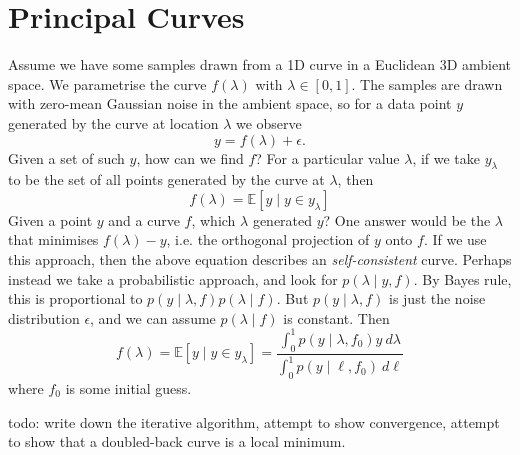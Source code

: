 \documentclass[a4paper]{article}
\begin{document}



    \section{Principal Curves}

        Assume we have some samples drawn from a 1D curve in a Euclidean 3D ambient space. We parametrise the curve $f(\lambda)$ with $\lambda \in [0, 1]$. The samples are drawn with zero-mean Gaussian noise in the ambient space, so for a data point $y$ generated by the curve at location $\lambda$ we observe
        \begin{equation}
            y = f(\lambda) + \epsilon.
        \end{equation}
        Given a set of such $y$, how can we find $f$? For a particular value $\lambda$, if we take $y_\lambda$ to be the set of all points generated by the curve at $\lambda$, then
        \begin{equation}
            f(\lambda) = \mathbb E[y \mid y \in y_\lambda]
        \end{equation}
        Given a point $y$ and a curve $f$, which $\lambda$ generated $y$? One answer would be the $\lambda$ that minimises $f(\lambda) - y$, i.e. the orthogonal projection of $y$ onto $f$. If we use this approach, then the above equation describes an \emph{self-consistent} curve. Perhaps instead we take a probabilistic approach, and look for $p(\lambda \mid y, f)$. By Bayes rule, this is proportional to $p(y \mid \lambda, f) p(\lambda \mid f)$. But $p(y \mid \lambda, f)$ is just the noise distribution $\epsilon$, and we can assume $p(\lambda \mid f)$ is constant. Then
        \begin{equation}
            f(\lambda) = \mathbb E[y \mid y \in y_\lambda] = \frac{\int_0^1 p(y \mid \lambda, f_0) y\  d\lambda}{\int_0^1 p(y \mid \ell, f_0)\ d\ell}
        \end{equation}
        where $f_0$ is some initial guess.

        todo: write down the iterative algorithm, attempt to show convergence, attempt to show that a doubled-back curve is a local minimum.

    
\end{document}
